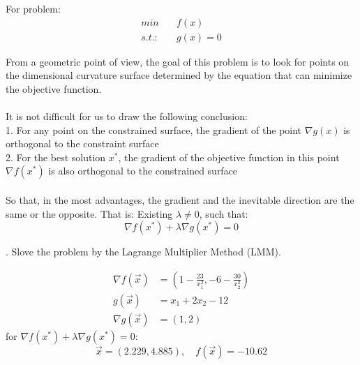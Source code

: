 \documentclass[12pt,a4paper]{article}
\begin{document}
\begin{spacing}{1.5}
\newpage
\noindent For problem:
\begin{equation*}
    \begin{aligned}
        min \quad & f(x)\\
        s.t.: \quad & g(x) = 0
    \end{aligned}
\end{equation*}

\noindent From a geometric point of view, the goal of this problem is to look for points on the dimensional curvature surface determined by the equation that can minimize the objective function. \\\\
It is not difficult for us to draw the following conclusion: \\
1. For any point on the constrained surface, the gradient of the point $\nabla g(x)$ is orthogonal to the constraint surface \\
2. For the best solution $x^*$, the gradient of the objective function in this point 
$\nabla f(x^*)$ is also orthogonal to the constrained surface \\\\
So that, in the most advantages, the gradient and the inevitable direction are the same or the opposite. That is: Existing $\lambda\not=0$, such that: 
\[
    \nabla f(x^*) + \lambda \nabla g(x^*) = 0
\]

. Slove the problem by the Lagrange Multiplier Method (LMM).

\begin{equation*}
    \begin{aligned}
        \nabla f(\vec{x}) &= (1-\frac{23}{x_1^2},-6-\frac{30}{x_2^2}) \\
        g(\vec{x}) &= x_1 + 2x_2 - 12 \\
        \nabla g(\vec{x}) &= (1,2)
    \end{aligned}
\end{equation*}
for $\nabla f(x^*) + \lambda \nabla g(x^*) = 0$:
\[
\vec{x} = (2.229, 4.885),\quad f(\vec{x}) = -10.62
\]

\newpage

\end{spacing}
\end{document}
